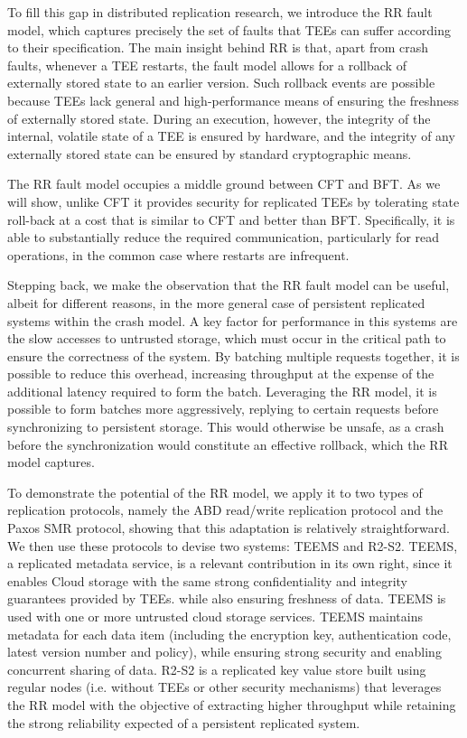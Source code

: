 To fill this gap in distributed replication research, we
introduce the \ac{RR} fault model, which
captures precisely the set of faults that \acp{TEE} can suffer according to
their specification.  The main insight behind \ac{RR} is that,
apart from crash faults, whenever a \ac{TEE} restarts, the fault model
allows for a rollback of externally stored state to an earlier
version.  Such rollback events are possible because \acp{TEE} lack general
and high-performance means of ensuring the freshness of externally
stored state.  During an execution, however, the integrity of the
internal, volatile state of a \ac{TEE} is ensured by hardware, and the
integrity of any externally stored state can be ensured by standard
cryptographic means.

The \ac{RR} fault model occupies a middle ground between \ac{CFT}
and \ac{BFT}. As we will show, unlike CFT it provides
security for replicated \acp{TEE} by tolerating state roll-back at a cost
that is similar to \ac{CFT} and better than \ac{BFT}. Specifically, it is able
to substantially reduce the required communication, particularly for
read operations, in the common case where restarts are
infrequent.

Stepping back, we make the observation that the \ac{RR} fault
model can be useful, albeit for different reasons, in the more
general case of persistent replicated systems within the crash
model. A key factor for performance in this systems are the slow
accesses to untrusted storage, which must occur in the critical
path to ensure the correctness of the system. By batching
multiple requests together, it is possible to reduce this
overhead, increasing throughput at the expense of the additional
latency required to form the batch. Leveraging the \ac{RR} model,
it is possible to form batches more aggressively, replying to
certain requests before synchronizing to persistent storage. This
would otherwise be unsafe, as a crash before the synchronization
would constitute an effective rollback, which the \ac{RR} model
captures.

To demonstrate the potential of the \ac{RR} model, we apply it to
two types of replication protocols, namely the \ac{ABD}
 read/write replication protocol and the Paxos \ac{SMR}
protocol, showing that this adaptation is relatively straightforward.
We then use these protocols to devise two systems: \ac{TEEMS} and
\ac{R2-S2}. \ac{TEEMS}, a replicated metadata service,
is a relevant contribution in its own right, since
it enables Cloud storage with the same strong confidentiality and
integrity guarantees provided by \acp{TEE}. while also ensuring freshness
of data. \ac{TEEMS} is used with one or more untrusted cloud storage
services. \ac{TEEMS} maintains metadata for each data item (including the
encryption key, authentication code, latest version number and
policy), while ensuring strong security and enabling concurrent
sharing of data. \ac{R2-S2} is a replicated key value store built
using regular nodes (i.e. without TEEs or other security
mechanisms) that leverages the \ac{RR} model with the objective
of extracting higher throughput while retaining the strong reliability expected of a persistent
replicated system.

